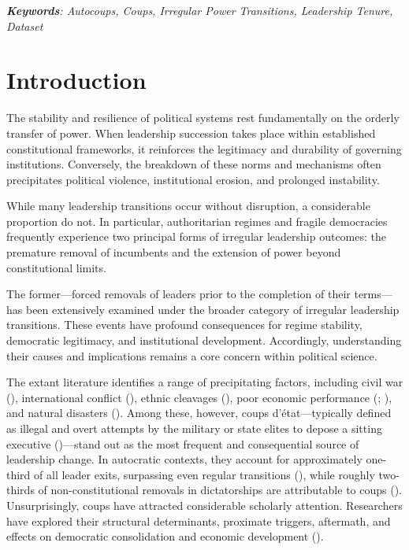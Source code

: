 \documentclass[
  12pt,
]{report}
\begin{document}
\emph{\textbf{Keywords}: Autocoups, Coups, Irregular Power Transitions,
Leadership Tenure, Dataset}

\section{Introduction}\label{introduction-1}

The stability and resilience of political systems rest fundamentally on
the orderly transfer of power. When leadership succession takes place
within established constitutional frameworks, it reinforces the
legitimacy and durability of governing institutions. Conversely, the
breakdown of these norms and mechanisms often precipitates political
violence, institutional erosion, and prolonged instability.

While many leadership transitions occur without disruption, a
considerable proportion do not. In particular, authoritarian regimes and
fragile democracies frequently experience two principal forms of
irregular leadership outcomes: the premature removal of incumbents and
the extension of power beyond constitutional limits.

The former---forced removals of leaders prior to the completion of their
terms---has been extensively examined under the broader category of
irregular leadership transitions. These events have profound
consequences for regime stability, democratic legitimacy, and
institutional development. Accordingly, understanding their causes and
implications remains a core concern within political science.

The extant literature identifies a range of precipitating factors,
including civil war (), international conflict (), ethnic cleavages
(), poor
economic performance (;
), and natural
disasters (). Among these, however, coups d'état---typically defined as
illegal and overt attempts by the military or state elites to depose a
sitting executive ()---stand out as the most frequent and consequential source of
leadership change. In autocratic contexts, they account for
approximately one-third of all leader exits, surpassing even regular
transitions (), while
roughly two-thirds of non-constitutional removals in dictatorships are
attributable to coups ().
Unsurprisingly, coups have attracted considerable scholarly attention.
Researchers have explored their structural determinants, proximate
triggers, aftermath, and effects on democratic consolidation and
economic development ().
\end{document}
